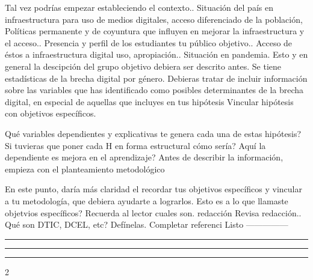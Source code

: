 Tal vez podrías empezar estableciendo el contexto.. Situación del país
en infraestructura para uso de medios digitales, acceso diferenciado de
la población, Políticas permanente y de coyuntura que influyen en
mejorar la infraestructura y el acceso.. Presencia y perfil de los
estudiantes tu público objetivo.. Acceso de éstos a infraestructura
digital uso, apropiación.. Situación en pandemia. Esto y en general la
descipción del grupo objetivo debiera ser descrito antes. Se tiene
estadísticas de la brecha digital por género. Debieras tratar de incluir
información sobre las variables que has identificado como posibles
determinantes de la brecha digital, en especial de aquellas que incluyes
en tus hipótesis Vincular hipótesis con objetivos específicos.

Qué variables dependientes y explicativas te genera cada una de estas
hipótesis? Si tuvieras que poner cada H en forma estructural cómo sería?
Aquí la dependiente es mejora en el aprendizaje? Antes de describir la
información, empieza con el planteamiento metodológico

En este punto, daría más claridad el recordar tus objetivos específicos
y vincular a tu metodología, que debiera ayudarte a lograrlos. Esto es a
lo que llamaste objetvios específicos? Recuerda al lector cuales son.
redacción Revisa redacción.. Qué son DTIC, DCEL, etc? Defínelas.
Completar referenci Listo ---------------

\begin{center}\rule{0.5\linewidth}{0.5pt}\end{center}

\begin{center}\rule{0.5\linewidth}{0.5pt}\end{center}

\begin{center}\rule{0.5\linewidth}{0.5pt}\end{center}

2
